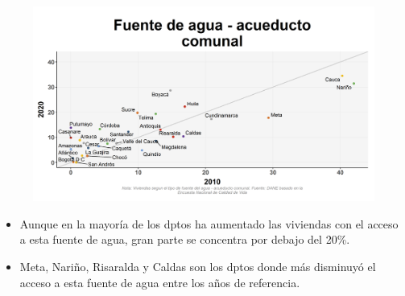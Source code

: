     \begin{figure}[H]
        \caption[Acueducto comunal como fuentes de agua por departamentos - 2010 VS 2020 ]{\label{cueducto_comunal_dptos_vs} }
        \begin{center}
        \includegraphics[width=\textwidth,keepaspectratio]{img/var_133_scatter_time.png}
        \end{center}
    \end{figure}
            \begin{itemize}
                    \item Aunque en la mayoría de los dptos ha aumentado las viviendas con el acceso a esta fuente de agua, gran parte se concentra por debajo del 20\%.
                    \item Meta, Nariño, Risaralda y Caldas son los dptos donde más disminuyó el acceso a esta fuente de agua entre los años de referencia.
                    \end{itemize}

